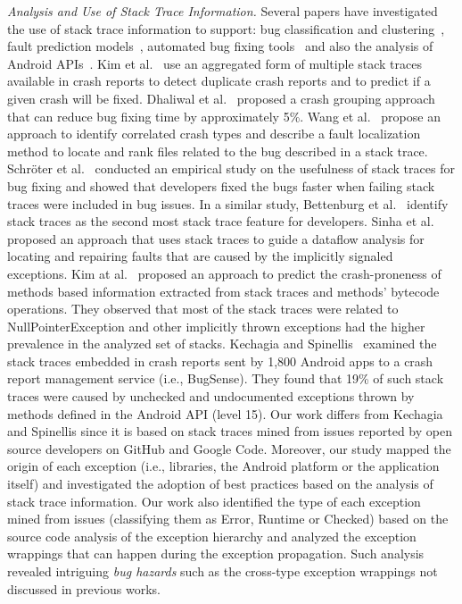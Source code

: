 \textit{Analysis and Use of Stack Trace Information.} Several papers have
investigated the use of stack trace information to support: bug classification
and clustering~\cite{wang2013improving, kim2011crash, dhaliwal2011classifying},
fault prediction models~\cite{kim2013predicting}, automated
bug fixing tools~\cite{sinha2009fault} and also the analysis of Android APIs~\cite{kechagia2014}. 
Kim et al.~\cite{kim2011crash} use an
aggregated form of multiple stack traces available in crash reports to detect
duplicate crash reports and to predict if a given crash will be fixed. Dhaliwal
et al.~\cite{dhaliwal2011classifying} proposed a crash grouping approach that
can reduce bug fixing time by approximately 5\%. Wang et
al.~\cite{wang2013improving} propose an approach to identify correlated crash
types and describe a fault localization method to locate and rank files related
to the bug described in a stack trace. Schr\"oter et al.~\cite{schroter2010stack}
conducted an empirical study on the usefulness of stack traces for bug fixing
and showed that developers fixed the bugs faster when failing stack traces were
included in bug issues.  In a similar study, Bettenburg et
al.~\cite{bettenburg2008makes} identify stack traces as the second most stack
trace feature for developers.  Sinha et al.~\cite{sinha2009fault} proposed an
approach that uses stack traces to guide a dataflow analysis for locating and
repairing faults that are caused by the implicitly signaled exceptions. Kim
at al.~\cite{kim2013predicting} proposed an approach to predict the
crash-proneness of methods based information extracted from stack traces and
methods' bytecode operations.  They observed that most of the stack traces were
related to NullPointerException and other implicitly thrown exceptions had
the higher prevalence in the analyzed set of stacks. Kechagia and Spinellis~\cite{kechagia2014}
examined the stack traces embedded in crash reports sent by 1,800 Android apps 
to a crash report management service (i.e., BugSense). They found that 19\% of such stack traces
were caused by unchecked and undocumented exceptions thrown by methods defined in the 
Android API (level 15). Our work differs from Kechagia and Spinellis since it is based on
stack traces mined from issues reported by open source developers on GitHub and Google Code.  
Moreover, our study mapped the origin of each exception 
(i.e., libraries, the Android platform or the application itself) and investigated
the adoption of best practices based on the analysis of stack trace information.
Our work also identified the type of each exception mined from issues
(classifying them as Error, Runtime or Checked) based on the source code
analysis of the exception hierarchy and analyzed the exception wrappings that can 
happen during the exception propagation.  Such analysis revealed intriguing 
\emph{bug hazards} such as the cross-type exception wrappings not discussed in previous works.


